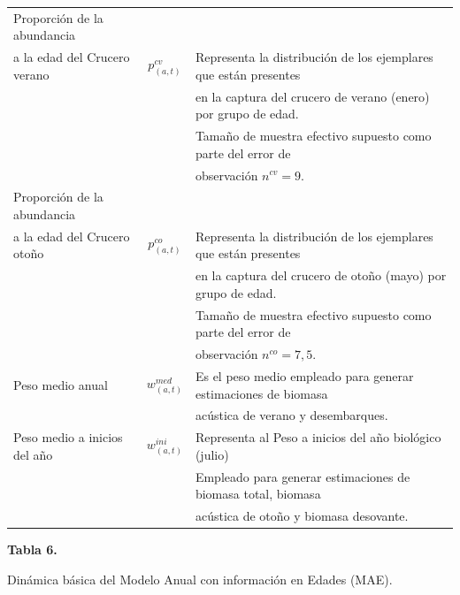\documentclass[
  spanish,
]{article}
\begin{document}
\begin{table}[h]
{\begin{tabular}{|l|c|l|}
Proporción de la abundancia    &                  & \\
a la edad del Crucero verano   & $p_{(a,t)}^{cv}$   & Representa la distribución de los ejemplares que están presentes \\
                               &                  & en la captura del crucero de verano (enero) por grupo de edad. \\
                               &                  & Tamaño de muestra efectivo supuesto como parte del error de \\
                               &                  & observación $n^{cv}=9$.\\ \hline
Proporción de la abundancia    &                  & \\
a la edad del Crucero otoño    & $p_{(a,t)}^{co}$ & Representa la distribución de los ejemplares que están presentes \\
                               &                  & en la captura del crucero de otoño (mayo) por grupo de edad. \\
                               &                  & Tamaño de muestra efectivo supuesto como parte del error de \\
                               &                  & observación $n^{co}=7,5$. \\ \hline
Peso medio anual               & $w_{(a,t)}^{med}$& Es el peso medio empleado para generar estimaciones de biomasa \\
                               &                  & acústica de verano y desembarques. \\ \hline
Peso medio a inicios del año   & $w_{(a,t)}^{ini}$& Representa al Peso a inicios del año biológico (julio) \\
                               &                  & Empleado para generar estimaciones de biomasa total, biomasa \\
                               &                  & acústica de otoño y biomasa desovante. \\ \hline
  \end{tabular}}
        \end{table}

\pagebreak

\small
\begin{center} 
\textbf{Tabla 6.}
\end{center}
\begin{center} 
\vspace{-0.2cm} Dinámica básica del Modelo Anual con información en Edades (MAE).
\end{center}
\vspace{-0.2cm}
\end{document}
